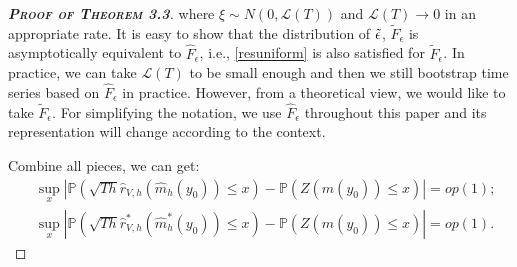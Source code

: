 \documentclass[a4paper]{article}
\begin{document}
\begin{proof}[\textbf{\textsc{Proof of Theorem 3.3}}]
where $\xi\sim N(0,\mathcal{L}(T))$ and $\mathcal{L}(T)\overset{}{\to}0$ in an appropriate rate. It is easy to show that the distribution of $\Tilde{\epsilon}$, $\widetilde{F}_{\epsilon}$ is asymptotically equivalent to $\widehat{F}_{\epsilon}$, i.e., \cref{resuniform} is also satisfied for $\widetilde{F}_{\epsilon}$. In practice, we can take $\mathcal{L}(T)$ to be small enough and then we still bootstrap time series based on $\widehat{F}_{\epsilon}$ in practice. However, from a theoretical view, we would like to take $\widetilde{F}_{\epsilon}$. For simplifying the notation, we use $\widehat{F}_{\epsilon}$ throughout this paper and its representation will change according to the context.


Combine all pieces, we can get:
\begin{equation}
\begin{split}
    &\sup_{x}\left|\mathbb{P}(\sqrt{Th}\hat{r}_{V,h}(\widehat{m}_{h}(y_0)) \leq x) - \mathbb{P}(Z(m(y_0))\leq x)     \right| = op(1);\\
    & \sup_{x}\left|\mathbb{P}(\sqrt{Th}\hat{r}^*_{V,h}(\widehat{m}^*_{h}(y_0)) \leq x) - \mathbb{P}(Z(m(y_0))\leq x)     \right| = op(1).
\end{split}
\end{equation}


\end{proof}
\end{document}
